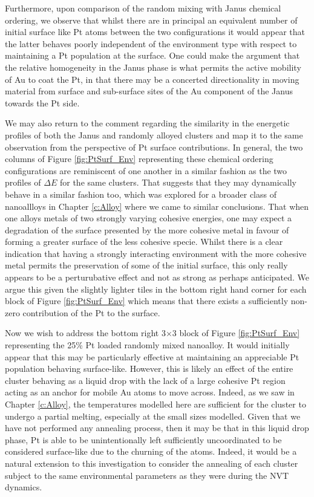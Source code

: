Furthermore, upon comparison of the random mixing with Janus chemical ordering, we observe that whilst there are in principal an equivalent number of initial surface like Pt atoms between the two configurations it would appear that the latter behaves poorly independent of the environment type with respect to maintaining a Pt population at the surface. One could make the argument that the relative homogeneity in the Janus phase is what permits the active mobility of Au to coat the Pt, in that there may be a concerted directionality in moving material from surface and sub-surface sites of the Au component of the Janus towards the Pt side. 

We may also return to the comment regarding the similarity in the energetic profiles of both the Janus and randomly alloyed clusters and map it to the same observation from the perspective of Pt surface contributions. In general, the two columns of Figure \ref{fig:PtSurf_Env} representing these chemical ordering configurations are reminiscent of one another in a similar fashion as the two profiles of $\Delta E$ for the same clusters. That suggests that they may dynamically behave in a similar fashion too, which was explored for a broader class of nanoallloys in Chapter \ref{c:Alloy} where we came to similar conclusions. That when one alloys metals of two strongly varying cohesive energies, one may expect a degradation of the surface presented by the more cohesive metal in favour of forming a greater surface of the less cohesive specie. Whilst there is a clear indication that having a strongly interacting environment with the more cohesive metal permits the preservation of some of the initial surface, this only really appears to be a perturubative effect and not as strong as perhaps anticipated. We argue this given the slightly lighter tiles in the bottom right hand corner for each block of Figure \ref{fig:PtSurf_Env} which means that there exists a sufficiently non-zero contribution of the Pt to the surface.

Now we wish to address the bottom right 3$\times$3 block of Figure \ref{fig:PtSurf_Env} representing the 25\% Pt loaded randomly mixed nanoalloy. It would initially appear that this may be particularly effective at maintaining an appreciable Pt population behaving surface-like. However, this is likely an effect of the entire cluster behaving as a liquid drop with the lack of a large cohesive Pt region acting as an anchor for mobile Au atoms to move across. Indeed, as we saw in Chapter \ref{c:Alloy}, the temperatures modelled here are sufficient for the cluster to undergo a partial melting, especially at the small sizes modelled. Given that we have not performed any annealing process, then it may be that in this liquid drop phase, Pt is able to be unintentionally left sufficiently uncoordinated to be considered surface-like due to the churning of the atoms. Indeed, it would be a natural extension to this investigation to consider the annealing of each cluster subject to the same environmental parameters as they were during the NVT dynamics.

